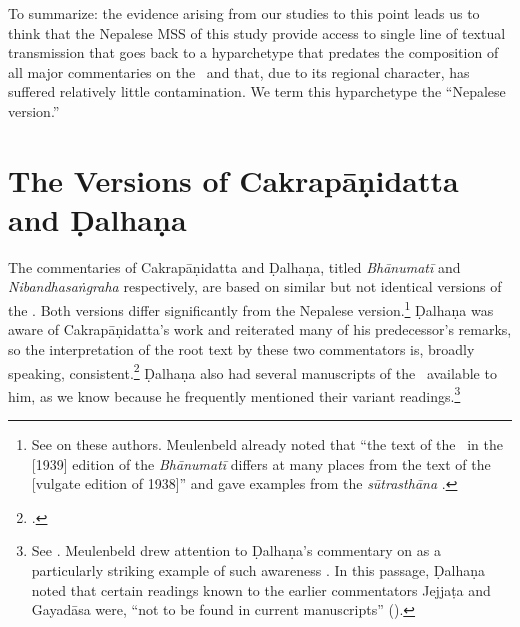 %
%

To summarize: the evidence arising from our studies to this point leads us to
think that the Nepalese MSS of this study provide access to single line of textual
transmission that goes back to a hyparchetype that predates the composition of all
major commentaries on the \SS\ and that, due to its regional character, has
suffered relatively little contamination. We term this hyparchetype the “Nepalese
version.” 



\section{The Versions of Cakrapāṇidatta and Ḍalhaṇa}

The commentaries of Cakrapāṇidatta and Ḍalhaṇa, titled \emph{Bhānumatī} and
\emph{Nibandhasaṅgraha} respectively, are based on similar but not identical
versions of the \SS.  Both versions differ significantly from the Nepalese
version.\footnote{See \cite[IA 374--379]{meul-hist} on these authors. Meulenbeld
already noted that “the text of the \SS\ in the [1939] edition of the
\emph{Bhānumatī} differs at many places from the text of the [vulgate edition of
1938]” and gave examples from the \emph{sūtrasthāna} \citep[IB, 496, note
76]{meul-hist}.} Ḍalhaṇa was aware of Cakrapāṇidatta's work and reiterated many of
his predecessor's remarks, so the interpretation of the root text by these two
commentators is, broadly speaking, consistent.\footcite[IB, 499,
n.\,162]{meul-hist}  Ḍalhaṇa also had several manuscripts of the \SS\
available to him, as we know because he frequently mentioned their variant
readings.\footnote{See \cite[IA, 377]{meul-hist}.  Meulenbeld drew attention to
Ḍalhaṇa's commentary on \Su{5.8.24cd--25ab}{587} as a particularly striking
example of such awareness \citep[IB, 497, n.\,112]{meul-hist}.  In this passage, Ḍalhaṇa
noted that certain readings known to the earlier commentators Jejjaṭa and Gayadāsa
were, “not to be found in current manuscripts” 
().}

